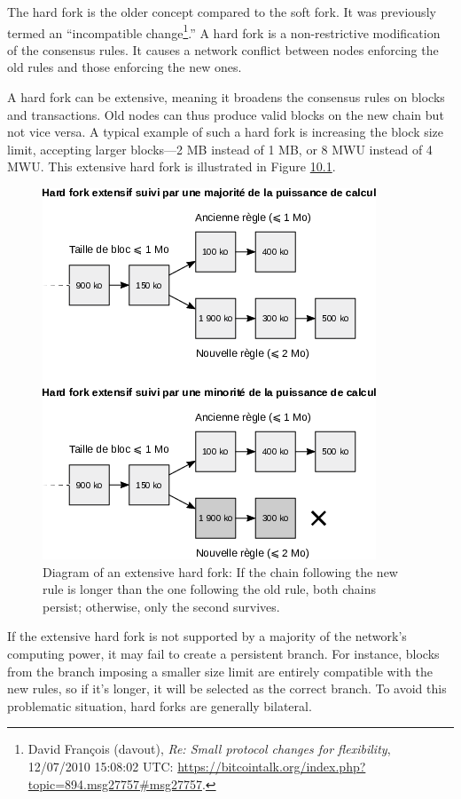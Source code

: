 \documentclass[
  a5paper,
  smalldemyvopaper,10pt,twoside,onecolumn,openright,extrafontsizes,hidelinks]{memoir}
\begin{document}
The hard fork is the older concept compared to the soft fork. It was
previously termed an ``incompatible change\footnote{David François
  (davout), \emph{Re: Small protocol changes for flexibility},
  12/07/2010 15:08:02 UTC:
  \url{https://bitcointalk.org/index.php?topic=894.msg27757\#msg27757}.}.''
A hard fork is a non-restrictive modification of the consensus rules. It
causes a network conflict between nodes enforcing the old rules and
those enforcing the new ones.

A hard fork can be extensive, meaning it broadens the consensus rules on
blocks and transactions. Old nodes can thus produce valid blocks on the
new chain but not vice versa. A typical example of such a hard fork is
increasing the block size limit, accepting larger blocks---2 MB instead
of 1 MB, or 8 MWU instead of 4 MWU. This extensive hard fork is
illustrated in Figure \hyperref[fig:expanding-hard-fork]{10.1}.

\begin{figure}

{\centering \includegraphics{chapters/img/expanding-hard-fork-induced-forks.png}

}

\caption{Diagram of an extensive hard fork: If the chain following the
new rule is longer than the one following the old rule, both chains
persist; otherwise, only the second survives.}

\end{figure}%

If the extensive hard fork is not supported by a majority of the
network's computing power, it may fail to create a persistent branch.
For instance, blocks from the branch imposing a smaller size limit are
entirely compatible with the new rules, so if it's longer, it will be
selected as the correct branch. To avoid this problematic situation,
hard forks are generally bilateral.
\end{document}
